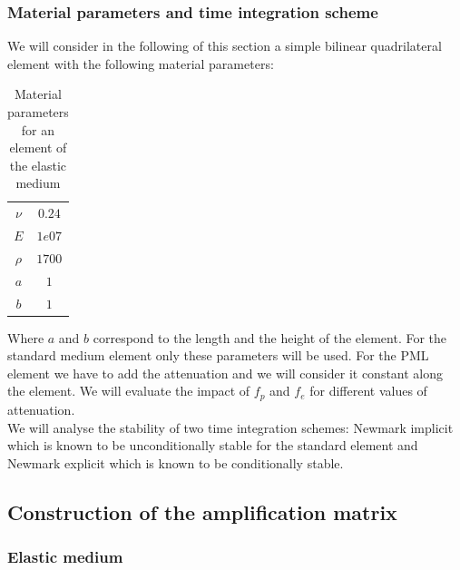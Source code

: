 \subsubsection{Material parameters and time integration scheme}
We will consider in the following of this section a simple bilinear quadrilateral element with the following material parameters:
\begin{table}[H]
\centering
\caption{Material parameters for an element of the elastic medium}
\begin{tabular}{c|c}
$\nu$ & $0.24$ \\
$E$ & $1e07$ \\
$\rho$ & $1700$ \\
$a$ & $1$ \\
$b$ & $1$
\end{tabular}
\end{table} 
Where $a$ and $b$ correspond to the length and the height of the element.
For the standard medium element only these parameters will be used. For the PML element we have to add the attenuation and we will consider it constant along the element. We will evaluate the impact of $f_p$ and $f_e$ for different values of attenuation.\\
We will analyse the stability of two time integration schemes: Newmark implicit which is known to be unconditionally stable for the standard element and Newmark explicit which is known to be conditionally stable. 
\subsection{Construction of the amplification matrix}
\subsubsection{Elastic medium}
\label{sec:constr-amp-st}


